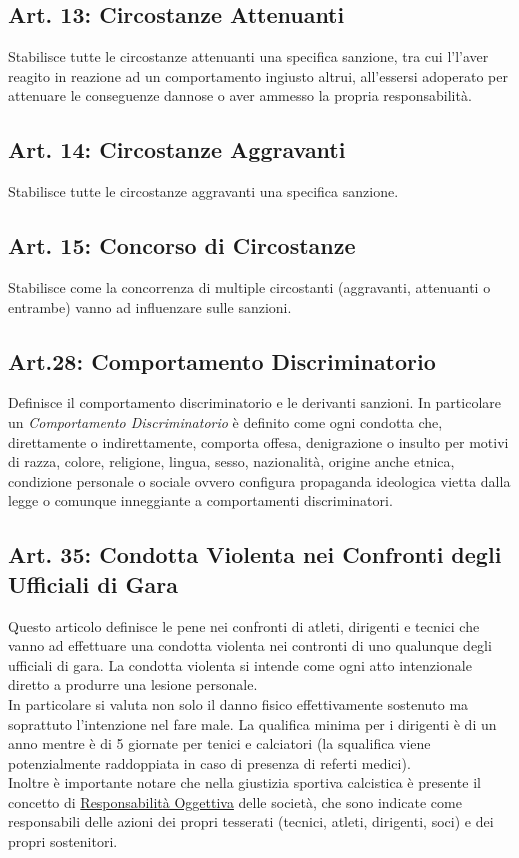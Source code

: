 \documentclass[../uefaC.tex]{subfiles}
\begin{document}
\subsection{Art. 13: Circostanze Attenuanti}
Stabilisce tutte le circostanze attenuanti una specifica sanzione, tra cui l'l'aver reagito in reazione ad un comportamento ingiusto altrui, all'essersi adoperato per attenuare le conseguenze dannose o aver ammesso la propria responsabilità.

\subsection{Art. 14: Circostanze Aggravanti}
Stabilisce tutte le circostanze aggravanti una specifica sanzione.

\subsection{Art. 15: Concorso di Circostanze}
Stabilisce come la concorrenza di multiple circostanti (aggravanti, attenuanti o entrambe) vanno ad influenzare sulle sanzioni.

\subsection{Art.28: Comportamento Discriminatorio}
Definisce il comportamento discriminatorio e le derivanti sanzioni. In particolare un \emph{Comportamento Discriminatorio} è definito come ogni condotta che, direttamente o indirettamente, comporta offesa, denigrazione o insulto per motivi di razza, colore, religione, lingua, sesso, nazionalità, origine anche etnica, condizione personale o sociale ovvero configura propaganda ideologica vietta dalla legge o comunque inneggiante a comportamenti discriminatori.

\subsection{Art. 35: Condotta Violenta nei Confronti degli Ufficiali di Gara}
Questo articolo definisce le pene nei confronti di atleti, dirigenti e tecnici che vanno ad effettuare una condotta violenta nei contronti di uno qualunque degli ufficiali di gara. La condotta violenta si intende come ogni atto intenzionale diretto a produrre una lesione personale. \hfill \\
In particolare si valuta non solo il danno fisico effettivamente sostenuto ma soprattuto l'intenzione nel fare male. La qualifica minima per i dirigenti è di un anno mentre è di 5 giornate per tenici e calciatori (la squalifica viene potenzialmente raddoppiata in caso di presenza di referti medici).
\hfill \\
Inoltre è importante notare che nella giustizia sportiva calcistica è presente il concetto di \underline{Responsabilità Oggettiva} delle società, che sono indicate come responsabili delle azioni dei propri tesserati (tecnici, atleti, dirigenti, soci) e dei propri sostenitori. \hfill \\
\end{document}
